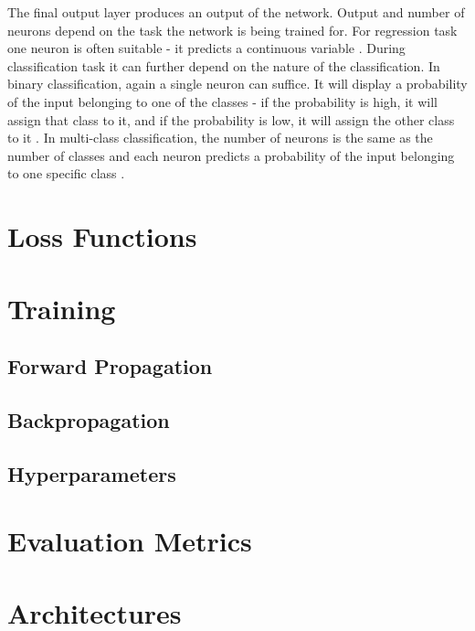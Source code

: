 The final output layer produces an output of the network. Output and number of neurons depend on the task the network is being trained for. For regression task one neuron is often suitable - it predicts a continuous variable \cite{Goodfellow2016}. During classification task it can further depend on the nature of the classification. In binary classification, again a single neuron can suffice. It will display a probability of the input belonging to one of the classes - if the probability is high, it will assign that class to it, and if the probability is low, it will assign the other class to it \cite{Goodfellow2016}. In multi-class classification, the number of neurons is the same as the number of classes and each neuron predicts a probability of the input belonging to one specific class \cite{Goodfellow2016}.


\section{Loss Functions}

\section{Training}

\subsection{Forward Propagation}

\subsection{Backpropagation}

\subsection{Hyperparameters}

\section{Evaluation Metrics}

\section{Architectures}